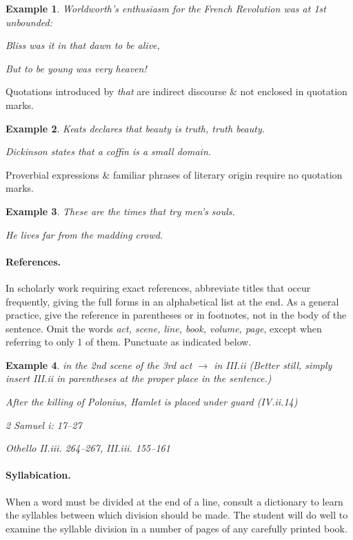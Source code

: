 \documentclass[oneside]{book}
\numberwithin{equation}{section}
\newtheorem{example}{Example}[chapter]
\begin{document}
\begin{example}
	Worldworth's enthusiasm for the French Revolution was at 1st unbounded:
	
	Bliss was it in that dawn to be alive,
	
	But to be young was very heaven!
\end{example}
Quotations introduced by \textit{that} are indirect discourse \& not enclosed in quotation marks.

\begin{example}
	Keats declares that beauty is truth, truth beauty.
	
	Dickinson states that a coffin is a small domain.
\end{example}
Proverbial expressions \& familiar phrases of literary origin require no quotation marks.

\begin{example}
	These are the times that try men's souls.
	
	He lives far from the madding crowd.
\end{example}

\paragraph*{References.} In scholarly work requiring exact references, abbreviate titles that occur frequently, giving the full forms in an alphabetical list at the end. As a general practice, give the reference in parentheses or in footnotes, not in the body of the sentence. Omit the words \textit{act, scene, line, book, volume, page}, except when referring to only 1 of them. Punctuate as indicated below.

\begin{example}
	in the 2nd scene of the 3rd act $\to$ in III.ii (Better still, simply insert III.ii in parentheses at the proper place in the sentence.)
	
	After the killing of Polonius, Hamlet is placed under guard (IV.ii.14)
	
	2 Samuel i: 17--27
	
	Othello II.iii. 264--267, III.iii. 155--161
\end{example}

\paragraph*{Syllabication.} When a word must be divided at the end of a line, consult a dictionary to learn the syllables between which division should be made. The student will do well to examine the syllable division in a number of pages of any carefully printed book.
\end{document}

